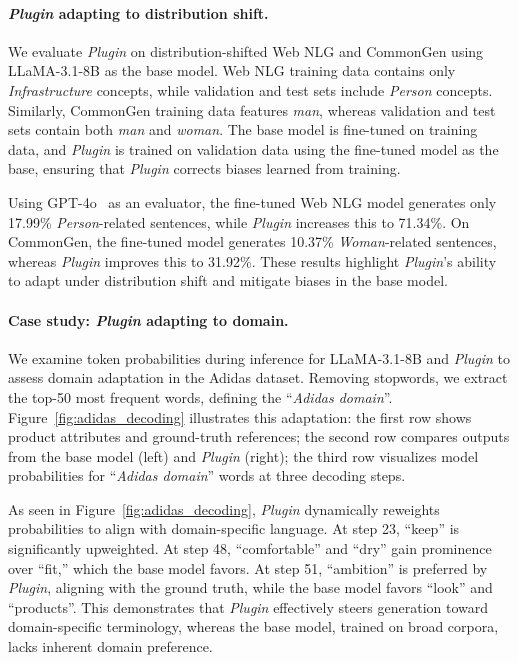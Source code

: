 \paragraph{\textit{Plugin} adapting to distribution shift.}  
We evaluate \textit{Plugin} on distribution-shifted Web NLG and CommonGen using LLaMA-3.1-8B as the base model. Web NLG training data contains only \textit{Infrastructure} concepts, while validation and test sets include \textit{Person} concepts. Similarly, CommonGen training data features \textit{man}, whereas validation and test sets contain both \textit{man} and \textit{woman}. The base model is fine-tuned on training data, and \textit{Plugin} is trained on validation data using the fine-tuned model as the base, ensuring that \textit{Plugin} corrects biases learned from training.  

Using GPT-4o~\citep{hurst2024gpt} as an evaluator, the fine-tuned Web NLG model generates only 17.99\% \textit{Person}-related sentences, while \textit{Plugin} increases this to 71.34\%. 
On CommonGen, the fine-tuned model generates 10.37\% \textit{Woman}-related sentences, whereas \textit{Plugin} improves this to 31.92\%. These results highlight \textit{Plugin}'s ability to adapt under distribution shift and mitigate biases in the base model.

\paragraph{Case study: \textit{Plugin} adapting to domain.}  
We examine token probabilities during inference for LLaMA-3.1-8B and \textit{Plugin} to assess domain adaptation in the Adidas dataset. Removing stopwords, we extract the top-50 most frequent words, defining the ``\textit{Adidas domain}''.
Figure~\ref{fig:adidas_decoding} illustrates this adaptation: the first row shows product attributes and ground-truth references; the second row compares outputs from the base model (left) and \textit{Plugin} (right); the third row visualizes model probabilities for ``\textit{Adidas domain}'' words at three decoding steps.

As seen in Figure~\ref{fig:adidas_decoding}, \textit{Plugin} dynamically reweights probabilities to align with domain-specific language. At step 23, ``keep'' is significantly upweighted. At step 48, ``comfortable'' and ``dry'' gain prominence over ``fit,'' which the base model favors. 
At step 51, ``ambition'' is preferred by \textit{Plugin}, aligning with the ground truth, while the base model favors ``look'' and ``products''. This demonstrates that \textit{Plugin} effectively steers generation toward domain-specific terminology, whereas the base model, trained on broad corpora, lacks inherent domain preference.








